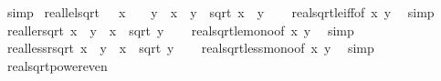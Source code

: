 \begin{isabellebody}
\ simp%
\endisatagproof
{\isafoldproof}%
%
\isadelimproof
\isanewline
%
\endisadelimproof
\isanewline
{}\isamarkupfalse%
\ real{\isacharunderscore}{\kern0pt}le{\isacharunderscore}{\kern0pt}lsqrt{\isacharcolon}{\kern0pt}\ {\isachardoublequoteopen}{}\ {\isasymle}\ x\ {\isasymLongrightarrow}\ {}\ {\isasymle}\ y\ {\isasymLongrightarrow}\ x\ {\isasymle}\ y\ {\isasymLongrightarrow}\ sqrt\ x\ {\isasymle}\ y{\isachardoublequoteclose}\isanewline
%
\isadelimproof
\ \ %
\endisadelimproof
%
\isatagproof
{}\isamarkupfalse%
\ real{\isacharunderscore}{\kern0pt}sqrt{\isacharunderscore}{\kern0pt}le{\isacharunderscore}{\kern0pt}iff{\isacharbrackleft}{\kern0pt}of\ x\ {\isachardoublequoteopen}y\ \isamarkupfalse%
\ simp%
\endisatagproof
{\isafoldproof}%
%
\isadelimproof
\isanewline
%
\endisadelimproof
\isanewline
{}\isamarkupfalse%
\ real{\isacharunderscore}{\kern0pt}le{\isacharunderscore}{\kern0pt}rsqrt{\isacharcolon}{\kern0pt}\ {\isachardoublequoteopen}x\ {\isasymle}\ y\ {\isasymLongrightarrow}\ x\ {\isasymle}\ sqrt\ y{\isachardoublequoteclose}\isanewline
%
\isadelimproof
\ \ %
\endisadelimproof
%
\isatagproof
{}\isamarkupfalse%
\ real{\isacharunderscore}{\kern0pt}sqrt{\isacharunderscore}{\kern0pt}le{\isacharunderscore}{\kern0pt}mono{\isacharbrackleft}{\kern0pt}of\ {\isachardoublequoteopen}x\ y{\isacharbrackright}{\kern0pt}\ \isamarkupfalse%
\ simp%
\endisatagproof
{\isafoldproof}%
%
\isadelimproof
\isanewline
%
\endisadelimproof
\isanewline
{}\isamarkupfalse%
\ real{\isacharunderscore}{\kern0pt}less{\isacharunderscore}{\kern0pt}rsqrt{\isacharcolon}{\kern0pt}\ {\isachardoublequoteopen}x\ {\isacharless}{\kern0pt}\ y\ {\isasymLongrightarrow}\ x\ {\isacharless}{\kern0pt}\ sqrt\ y{\isachardoublequoteclose}\isanewline
%
\isadelimproof
\ \ %
\endisadelimproof
%
\isatagproof
{}\isamarkupfalse%
\ real{\isacharunderscore}{\kern0pt}sqrt{\isacharunderscore}{\kern0pt}less{\isacharunderscore}{\kern0pt}mono{\isacharbrackleft}{\kern0pt}of\ {\isachardoublequoteopen}x\ y{\isacharbrackright}{\kern0pt}\ \isamarkupfalse%
\ simp%
\endisatagproof
{\isafoldproof}%
%
\isadelimproof
\isanewline
%
\endisadelimproof
\isanewline
{}\isamarkupfalse%
\ real{\isacharunderscore}{\kern0pt}sqrt{\isacharunderscore}{\kern0pt}power{\isacharunderscore}{\kern0pt}even{\isacharcolon}{\kern0pt}\isanewline

\end{isabellebody}
